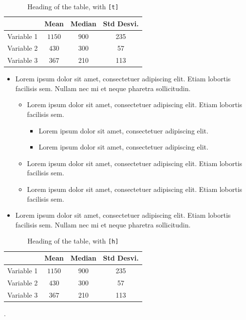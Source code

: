 \documentclass[12pt,green,palatino]{../bppaper}
\begin{document}
\blindtext
\begin{table}[t]
\centering
\caption{Heading of the table, with \texttt{[t]}}
\begin{tabular}{cccc} \toprule
    & Mean & Median & Std Desvi.\\ \midrule
    Variable 1 & $1150$ & 900 & 235 \\ 
    Variable 2 & $430$ & 300 & 57 \\ 
    Variable 3 & $367$ & 210 & 113 \\ \bottomrule
\end{tabular}
\end{table}
\blindtext
\begin{itemize}
    \item Lorem ipsum dolor sit amet, consectetuer adipiscing elit. Etiam lobortis facilisis sem. Nullam nec mi et neque pharetra sollicitudin. 
    \begin{itemize}
        \item Lorem ipsum dolor sit amet, consectetuer adipiscing elit. Etiam lobortis facilisis sem.
        \begin{itemize}
            \item Lorem ipsum dolor sit amet, consectetuer adipiscing elit. 
            \item Lorem ipsum dolor sit amet, consectetuer adipiscing elit.
        \end{itemize}
        \item Lorem ipsum dolor sit amet, consectetuer adipiscing elit. Etiam lobortis facilisis sem.
        \item Lorem ipsum dolor sit amet, consectetuer adipiscing elit. Etiam lobortis facilisis sem.
    \end{itemize}
    \item Lorem ipsum dolor sit amet, consectetuer adipiscing elit. Etiam lobortis facilisis sem. Nullam nec mi et neque pharetra sollicitudin. 
\end{itemize}
\blindtext
\begin{table}[h]
\centering
\caption{Heading of the table, with \texttt{[h]}}
\begin{tabular}{cccc} \toprule
    & Mean & Median & Std Desvi.\\ \midrule
    Variable 1 & $1150$ & 900 & 235 \\ 
    Variable 2 & $430$ & 300 & 57 \\ 
    Variable 3 & $367$ & 210 & 113 \\ \bottomrule
\end{tabular}\par
\end{table}
\cite{lesk:1977}.
\blindtext
\end{document}
